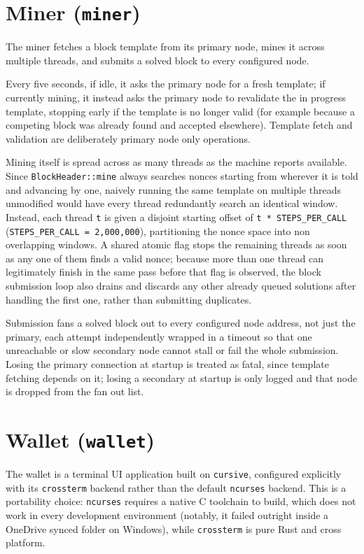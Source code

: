 \documentclass[11pt]{article}
\newcommand{\code}[1]{\texttt{#1}}
\begin{document}
\section{Miner (\code{miner})}

The miner fetches a block template from its primary node, mines it across multiple threads, and submits a solved block to every configured node.

Every five seconds, if idle, it asks the primary node for a fresh template; if currently mining, it instead asks the primary node to revalidate the in progress template, stopping early if the template is no longer valid (for example because a competing block was already found and accepted elsewhere). Template fetch and validation are deliberately primary node only operations.

Mining itself is spread across as many threads as the machine reports available. Since \code{BlockHeader::mine} always searches nonces starting from wherever it is told and advancing by one, naively running the same template on multiple threads unmodified would have every thread redundantly search an identical window. Instead, each thread \code{t} is given a disjoint starting offset of \code{t * STEPS\_PER\_CALL} (\code{STEPS\_PER\_CALL = 2{,}000{,}000}), partitioning the nonce space into non overlapping windows. A shared atomic flag stops the remaining threads as soon as any one of them finds a valid nonce; because more than one thread can legitimately finish in the same pass before that flag is observed, the block submission loop also drains and discards any other already queued solutions after handling the first one, rather than submitting duplicates.

Submission fans a solved block out to every configured node address, not just the primary, each attempt independently wrapped in a timeout so that one unreachable or slow secondary node cannot stall or fail the whole submission. Losing the primary connection at startup is treated as fatal, since template fetching depends on it; losing a secondary at startup is only logged and that node is dropped from the fan out list.

\section{Wallet (\code{wallet})}

The wallet is a terminal UI application built on \code{cursive}, configured explicitly with its \code{crossterm} backend rather than the default \code{ncurses} backend. This is a portability choice: \code{ncurses} requires a native C toolchain to build, which does not work in every development environment (notably, it failed outright inside a OneDrive synced folder on Windows), while \code{crossterm} is pure Rust and cross platform.
\end{document}
